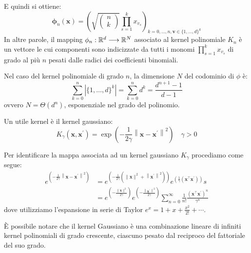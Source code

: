 \documentclass[\main/main.tex]{subfiles}
\begin{document}
\begin{multicols}{2}
\begin{definition}
    E quindi si ottiene:
    \[\boldsymbol{\phi}_{n}(\boldsymbol{x})=\left(\sqrt{\left( \begin{array}{c}{n} \\ {k}\end{array}\right)} \prod_{s=1}^{k} x_{v_{s}}\right)_{k=0, \ldots, n, \boldsymbol{v} \in\{1, \ldots, d\}^{k}}\]
    In altre parole, il mapping \(\phi_n:\mathbb{R}^d\longrightarrow \mathbb{R}^N\) associato al kernel polinomiale \(K_n\) è un vettore le cui componenti sono indicizzate da tutti i monomi \(\prod_{s=1}^{k} x_{v_{s}}\) di grado al più \(n\) pesati dalle radici dei coefficienti binomiali.
    
    Nel caso del kernel polinomiale di grado \(n\), la dimensione \(N\) del codominio di \(\phi\) è:
    \[\sum_{k=0}^{n}\left|\{1, \ldots, d\}^{k}\right|=\sum_{k=0}^{n} d^{k}=\frac{d^{n+1}-1}{d-1}\]
    ovvero \(N=\Theta\left(d^{n}\right)\), esponenziale nel grado del polinomio.
\end{definition}
\begin{definition}
    Un utile kernel è il kernel gaussiano:
    \[K_{\gamma}\left(\boldsymbol{x}, \boldsymbol{x}^{\prime}\right)=\exp \left(-\frac{1}{2 \gamma}\left\|\boldsymbol{x}-\boldsymbol{x}^{\prime}\right\|^{2}\right) \quad \gamma>0\]
\end{definition}
\begin{definition}
    Per identificare la mappa associata ad un kernel gaussiano \(K_{\gamma}\) procediamo come segue:
    \begin{align*} e^{\left(-\frac{1}{2 \gamma}\left\|\boldsymbol{x}-\boldsymbol{x}^{\prime}\right\|^{2}\right)} &=e^{ \left(-\frac{1}{2 \gamma}\left(\|\boldsymbol{x}\|^{2}+\left\|\boldsymbol{x}^{\prime}\right\|^{2}\right)\right)} e^{\left(\frac{1}{\gamma}\left(\boldsymbol{x}^{\top} \boldsymbol{x}^{\prime}\right)\right)}s \\ &=e^{ \left(-\frac{\|\boldsymbol{x}\|^{2}}{2 \gamma}\right)} e^{ \left(-\frac{\left\|\boldsymbol{x}^{\prime}\right\|^{2}}{2 \gamma}\right)} \sum_{n=0}^{\infty} \frac{1}{n !} \frac{\left(\boldsymbol{x}^{\top} \boldsymbol{x}^{\prime}\right)^{n}}{\gamma^{n}} \end{align*}
    dove utilizziamo l'espansione in serie di Taylor \(e^{x}=1+x+\frac{x^{2}}{2 !}+\cdots\).
    
    È possibile notare che il kernel Gaussiano è una combinazione lineare di infiniti kernel polinomiali di grado crescente, ciascuno pesato dal reciproco del fattoriale del suo grado.
    

\end{definition}
\end{multicols}
\end{document}
